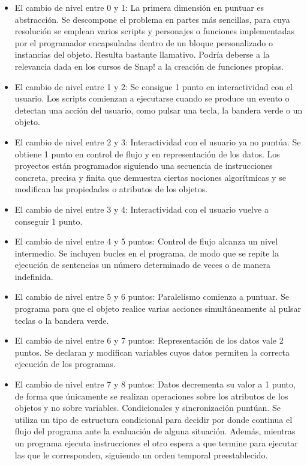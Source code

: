 \documentclass[a4paper, 12pt]{book}
\begin{document}
\begin{itemize}
 \item El cambio de nivel entre 0 y 1:  La primera dimensión en puntuar es abstracción. Se descompone el problema en partes más sencillas, para cuya resolución se emplean varios scripts y personajes o funciones implementadas por el programador encapsuladas dentro de un bloque personalizado o instancias del objeto. Resulta bastante llamativo. Podría deberse a la relevancia dada en los cursos de Snap! a la creación de funciones propias.
 \item El cambio de nivel entre 1 y 2: Se consigue 1 punto en interactividad con el usuario. Los scripts comienzan a ejecutarse cuando se produce un evento o detectan una acción del usuario, como pulsar una tecla, la bandera verde o un objeto.
 \item El cambio de nivel entre 2 y 3: Interactividad con el usuario ya no puntúa. Se obtiene 1 punto en control de flujo y en representación de los datos. Los proyectos están programados siguiendo una secuencia de instrucciones concreta, precisa y finita que demuestra ciertas nociones algorítmicas y se modifican las propiedades o atributos de los objetos.
 \item El cambio de nivel entre 3 y 4: Interactividad con el usuario vuelve a conseguir 1 punto.
 \item El cambio de nivel entre 4 y 5 puntos: Control de flujo alcanza un nivel intermedio. Se incluyen bucles en el programa, de modo que se repite la ejecución de sentencias un número determinado de veces o de manera indefinida. %
 \item El cambio de nivel entre 5 y 6 puntos: Paralelismo comienza a puntuar. Se programa para que el objeto realice varias acciones simultáneamente al pulsar teclas o la bandera verde.
 \item El cambio de nivel entre 6 y 7 puntos: Representación de los datos vale 2 puntos. Se declaran y modifican variables cuyos datos permiten la correcta ejecución de los programas.
 \item El cambio de nivel entre 7 y 8 puntos: Datos decrementa su valor a 1 punto, de forma que únicamente se realizan operaciones sobre los atributos de los objetos y no sobre variables. Condicionales y sincronización puntúan. Se utiliza un tipo de estructura condicional para decidir por donde continua el flujo del programa ante la evaluación de alguna situación. Además, mientras un programa ejecuta instrucciones el otro espera a que termine para ejecutar las que le corresponden, siguiendo un orden temporal preestablecido.

\end{itemize}
\end{document}
